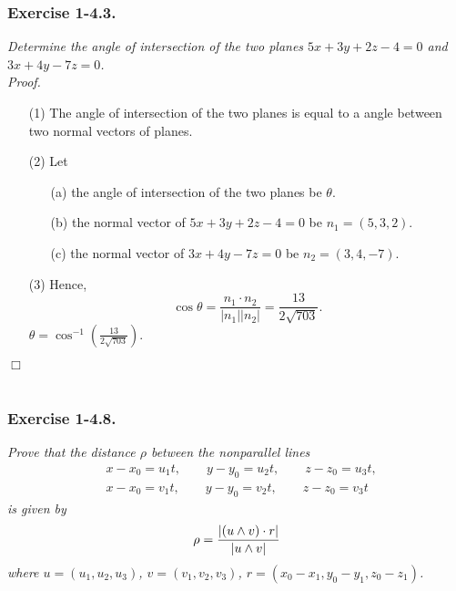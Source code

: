 \documentclass{article}
\begin{document}



\subsubsection*{Exercise 1-4.3.}
\emph{Determine the angle of intersection of the two planes
$5x+3y+2z-4=0$ and $3x+4y-7z=0$.} \\



\emph{Proof.}
\begin{enumerate}
\item[(1)]
The angle of intersection of the two planes
is equal to a angle between two normal vectors of planes.
\item[(2)]
Let
  \begin{enumerate}
  \item[(a)]
  the angle of intersection of the two planes be $\theta$.
  \item[(b)]
  the normal vector of $5x+3y+2z-4=0$ be $n_1 = (5,3,2)$.
  \item[(c)]
  the normal vector of $3x+4y-7z=0$ be $n_2 = (3,4,-7)$.
  \end{enumerate}
\item[(3)]
Hence,
$$\cos\theta = \frac{n_1 \cdot n_2}{|n_1||n_2|} = \frac{13}{2\sqrt{703}}.$$
$\theta = \cos^{-1}\left( \frac{13}{2\sqrt{703}} \right)$.
\end{enumerate}
$\Box$ \\\\






\subsubsection*{Exercise 1-4.8.}
\emph{Prove that the distance $\rho$ between the nonparallel lines
\begin{align*}
  & x-x_0 = u_1 t, \qquad y-y_0 = u_2 t, \qquad z-z_0 = u_3 t, \\
  & x-x_0 = v_1 t, \qquad y-y_0 = v_2 t, \qquad z-z_0 = v_3 t
\end{align*}
is given by
\[
  \rho = \frac{\abs{(u \wedge v) \cdot r}}{\abs{u \wedge v}}
\]
where $u = (u_1,u_2,u_3)$, $v = (v_1,v_2,v_3)$,
$r = (x_0-x_1,y_0-y_1,z_0-z_1)$.} \\
\end{document}
